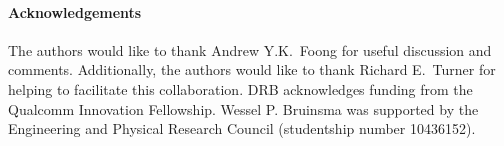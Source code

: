 \documentclass[twoside]{article}
\theoremstyle{theoremstyle}
\begin{document}





%
\paragraph{Acknowledgements}
The authors would like to thank Andrew Y.K.~Foong for useful discussion and comments. Additionally, the authors would like to thank Richard E.~Turner for helping to facilitate this collaboration. DRB acknowledges funding from the Qualcomm Innovation Fellowship.
Wessel P. Bruinsma was supported by the Engineering and Physical Research Council (studentship number 10436152). 


\clearpage
\appendix
\onecolumn \makesupplementtitle
\end{document}
